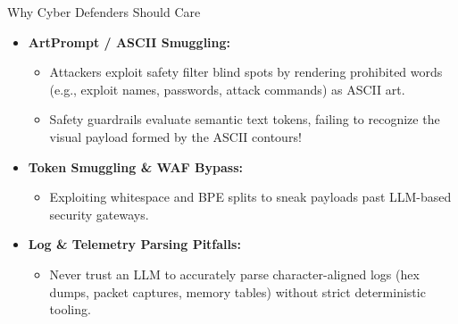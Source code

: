 \documentclass[12pt]{beamer}
\begin{document}
\begin{frame}{Why Cyber Defenders Should Care}
  \begin{itemize}
    \item \textbf{ArtPrompt / ASCII Smuggling:}
      \begin{itemize}
        \item Attackers exploit safety filter blind spots by rendering prohibited words (e.g., exploit names, passwords, attack commands) as ASCII art.
        \item Safety guardrails evaluate semantic text tokens, failing to recognize the visual payload formed by the ASCII contours!
      \end{itemize}
    \item \textbf{Token Smuggling \& WAF Bypass:}
      \begin{itemize}
        \item Exploiting whitespace and BPE splits to sneak payloads past LLM-based security gateways.
      \end{itemize}
    \item \textbf{Log \& Telemetry Parsing Pitfalls:}
      \begin{itemize}
        \item Never trust an LLM to accurately parse character-aligned logs (hex dumps, packet captures, memory tables) without strict deterministic tooling.
      \end{itemize}
  \end{itemize}
\end{frame}
\end{document}

